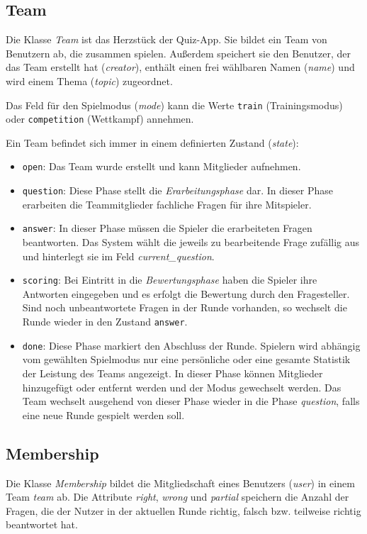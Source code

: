 \documentclass[a4paper,11pt,listof=numbered,glossary=totoc,parskip=half,toc=bib]{scrreprt}
\begin{document}
		\subsection{Team}
	Die Klasse \textit{Team} ist das Herzstück der Quiz-App. Sie bildet ein Team von Benutzern ab, die zusammen spielen. Außerdem speichert sie den Benutzer, der das Team erstellt hat (\textit{creator}), enthält einen frei wählbaren Namen (\textit{name}) und wird einem Thema (\textit{topic}) zugeordnet.
	
	Das Feld für den Spielmodus (\textit{mode}) kann die Werte \texttt{train} (Trainingsmodus) oder \texttt{competition} (Wettkampf) annehmen.
	
	Ein Team befindet sich immer in einem definierten Zustand (\textit{state}):
	
	\begin{itemize}
		\item \texttt{open}: Das Team wurde erstellt und kann Mitglieder aufnehmen.
		\item \texttt{question}: Diese Phase stellt die \textit{Erarbeitungsphase} dar. In dieser Phase erarbeiten die Teammitglieder fachliche Fragen für ihre Mitspieler. 
		\item \texttt{answer}: In dieser Phase müssen die Spieler die erarbeiteten Fragen beantworten. Das System wählt die jeweils zu bearbeitende Frage zufällig aus und hinterlegt sie im Feld \textit{current\_{}question}.
		\item \texttt{scoring}: Bei Eintritt in die \textit{Bewertungsphase} haben die Spieler ihre Antworten eingegeben und es erfolgt die Bewertung durch den Fragesteller. Sind noch unbeantwortete Fragen in der Runde vorhanden, so wechselt die Runde wieder in den Zustand \texttt{answer}.
		
		\item \texttt{done}: Diese Phase markiert den Abschluss der Runde. Spielern wird abhängig vom gewählten Spielmodus nur eine persönliche oder eine gesamte Statistik der Leistung des Teams angezeigt. In dieser Phase können Mitglieder hinzugefügt oder entfernt werden und der Modus gewechselt werden. Das Team wechselt ausgehend von dieser Phase wieder in die Phase \textit{question}, falls eine neue Runde gespielt werden soll.
		
	\end{itemize}
	
	\subsection{Membership}
	Die Klasse \textit{Membership} bildet die Mitgliedschaft eines Benutzers (\textit{user}) in einem Team \textit{team} ab.
	Die Attribute \textit{right}, \textit{wrong} und \textit{partial} speichern die Anzahl der Fragen, die der Nutzer in der aktuellen Runde richtig, falsch bzw. teilweise richtig beantwortet hat. 
	
\end{document}
